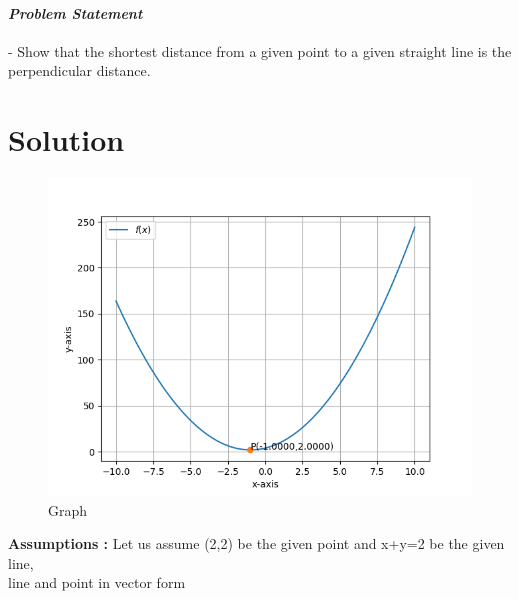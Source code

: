 \documentclass[10pt, a4paper]{article}
\title{\mytitle}
\author{\myauthor\hspace{1em}\\\contact\\IITH\hspace{0.5em}-\hspace{0.5em}\mymodule}
\date{}
\begin{document}
	\maketitle
\paragraph{\textit{Problem Statement}}- Show that the shortest distance from a given point to a given straight line is the perpendicular distance.

\section*{\large Solution}
\begin{figure}[H]
\centering
\includegraphics[width=1\columnwidth]{Figure1.png}
\caption{Graph}
\label{fig:triangle}
\end{figure}
\textbf{Assumptions :}
Let us assume (2,2) be the given point and x+y=2 be the given line,\\
line and point in vector form \\
\end{document}

